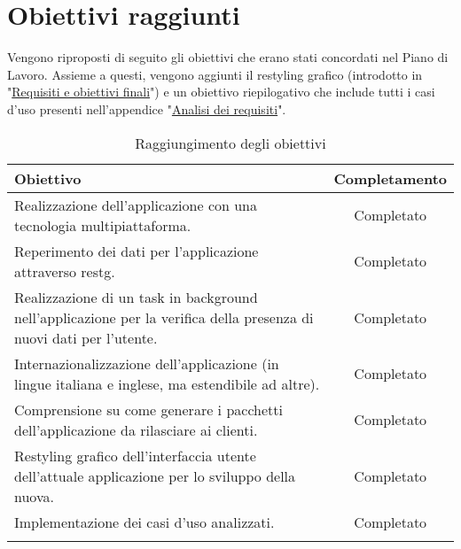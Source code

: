 \section{Obiettivi raggiunti}
\label{sec:obiettivi-raggiunti}

Vengono riproposti di seguito gli obiettivi che erano stati concordati nel Piano di Lavoro. Assieme a questi, vengono aggiunti il restyling grafico (introdotto in "\hyperref[sec:requisiti-obiettivi-finali]{Requisiti e obiettivi finali}") e un obiettivo riepilogativo che include tutti i casi d'uso presenti nell'appendice "\hyperref[cap:analisi-dei-requisiti]{Analisi dei requisiti}".

{
\renewcommand{\arraystretch}{1.5}
\begin{longtable}{|C{9cm}|c|}
    \hline
    \textbf{Obiettivo} & \textbf{Completamento} \\\hline
    \endhead
    Realizzazione dell'applicazione con una tecnologia multipiattaforma. & Completato\\\hline
    Reperimento dei dati per l'applicazione attraverso \gls{restg}. & Completato \\\hline
    Realizzazione di un task in background nell'applicazione per la verifica della presenza di nuovi dati per l'utente. & Completato \\\hline
    Internazionalizzazione dell'applicazione (in lingue italiana e inglese, ma estendibile ad altre). & Completato \\\hline
    Comprensione su come generare i pacchetti dell'applicazione da rilasciare ai clienti. & Completato \\\hline
    Restyling grafico dell'interfaccia utente dell'attuale applicazione per lo sviluppo della nuova. & Completato \\\hline
    Implementazione dei casi d'uso analizzati. & Completato \\\hline
    \caption{Raggiungimento degli obiettivi}
\end{longtable}
}